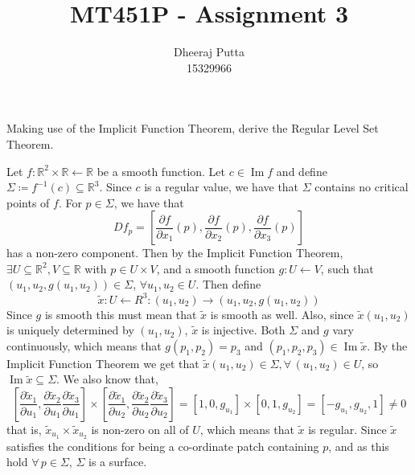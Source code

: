 \documentclass[12pt, answers]{exam}
\title{MT451P - Assignment 3}
\author{Dheeraj Putta \\ 15329966}
\date{}
\DeclareMathOperator{\im}{Im}
\begin{document}
    \maketitle
    \begin{questions}
        \thispagestyle{foot}

        \question Making use of the Implicit Function Theorem, derive the Regular Level Set Theorem.
        \begin{solution}
            Let $f : \mathbb{R}^2 \times \mathbb{R} \leftarrow \mathbb{R}$ be a smooth function. Let $c \in \im f$ and define
            $\Sigma \coloneqq f^{-1}(c) \subseteq \mathbb{R}^3$. Since $c$ is a regular value, we have that $\Sigma$ contains
            no critical points of $f$. For $p \in \Sigma$, we have that
            \[ Df_p = \left[\frac{\partial f}{\partial x_1}(p), \frac{\partial f}{\partial x_2}(p), \frac{\partial f}{\partial x_3}(p)\right] \]
            has a non-zero component. Then by the Implicit Function Theorem, $\exists U \subseteq \mathbb{R}^2, V \subseteq \mathbb{R}$
            with $p \in U \times V$, and a smooth function $g:U \leftarrow V$, such that $(u_1, u_2, g(u_1, u_2)) \in \Sigma$,
            $\forall u_1, u_2 \in U$. Then define
            \[ \tilde{x}: U \leftarrow R^3 :  (u_1, u_2) \to (u_1, u_2, g(u_1, u_2))\]
            Since $g$ is smooth this must mean that $\tilde{x}$ is smooth as well. Also, since $\tilde{x}(u_1, u_2)$ is
            uniquely determined by $(u_1, u_2)$, $\tilde{x}$ is injective. Both $\Sigma$ and $g$ vary continuously, which
            means that $g(p_1, p_2) = p_3$ and $(p_1, p_2, p_3) \in \im \tilde{x}$. By the Implicit Function Theorem we
            get that $\tilde{x}(u_1, u_2) \in \Sigma, \forall \, (u_1, u_2) \in U$, so $\im \tilde{x} \subseteq \Sigma$.
            We also know that,
            \[ \left[ \frac{\partial\tilde{x}_1}{\partial u_1}, \frac{\partial\tilde{x}_2}{\partial u_1}  \frac{\partial\tilde{x}_3}{\partial u_1}\right]
            \times \left[ \frac{\partial\tilde{x}_1}{\partial u_2}, \frac{\partial\tilde{x}_2}{\partial u_2}  \frac{\partial\tilde{x}_3}{\partial u_2}\right]
             = [1, 0, g_{u_1}] \times [0, 1, g_{u_2}] = [-g_{u_1}, g_{u_2}, 1] \neq 0\]
            that is, $\tilde{x}_{u_1} \times \tilde{x}_{u_2}$ is non-zero on all of $U$, which means that $\tilde{x}$ is
            regular. Since $\tilde{x}$ satisfies the conditions for being a co-ordinate patch containing $p$, and as this
            hold $\forall \, p \in \Sigma$, $\Sigma$ is a surface.
        \end{solution}


\end{questions}
\end{document}
